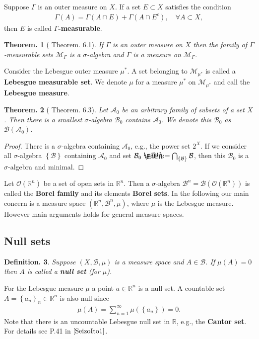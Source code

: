 \documentclass[openany, a4paper, oneside]{jsbook}
\makeatletter
\newcommand*{\defeq}{\mathrel{\rlap{%
\raisebox{0.3ex}{$\m@th\cdot$}}%
\raisebox{-0.3ex}{$\m@th\cdot$}}%
=}
\theoremstyle{break}
\theoremstyle{breakdefn}
\newtheorem{thm}{Theorem.}[section]
\newtheorem{defn}[thm]{Definition.}
\newcommand{\rbk}[1]{\left (#1\right)}
\newcommand{\cbk}[1]{\left\{#1\right\}}
\newcommand{\bbR}{\mathbb{R}}
\newcommand{\bbRn}{\mathbb{R}^n}
\newcommand{\calA}{\mathcal{A}}
\newcommand{\calB}{\mathcal{B}}
\newcommand{\calM}{\mathcal{M}}
\newcommand{\calO}{\mathcal{O}}
\newcommand{\upbf}[1]{\textup{\textbf{#1}}}
\makeatother
\begin{document}
Suppose $\Gamma$ is an outer measure on $X$.
If a set $E \subset X$ satisfies the condition
\begin{align}
 \Gamma (A)
 =
 \Gamma \rbk{A \cap E} + \Gamma \rbk{A \cap E^{c}},
 \quad \forall A \subset X,
\end{align}
then $E$ is called \upbf{$\Gamma$-measurable}.
\begin{thm}[\cite{SeizoIto1} Theorem. 6.1]
 If $\Gamma$ is an outer measure on $X$ then the family of $\Gamma$-measurable sets $\calM_{\Gamma}$ is
 a $\sigma$-algebra and $\Gamma$ is a measure on $\calM_{\Gamma}$.
\end{thm}
Consider the Lebesgue outer measure $\mu^*$.
A set belonging to $\calM_{\mu^*}$ is called a \textbf{Lebesgue measurable set}.
We denote $\mu$ for a measure $\mu^*$ on $\calM_{\mu^*}$ and call the \textbf{Lebesgue measure}.
\begin{thm}[\cite{SeizoIto1} Theorem. 6.3]
 Let $\calA_0$ be an arbitrary family of subsets of a set $X$.
 Then there is a smallest $\sigma$-algebra $\calB_0$ contains $\calA_0$.
 We denote this $\calB_0$ as $\calB (\calA_0)$.
\end{thm}
\begin{proof}
There is a $\sigma$-algebra containing $\calA_0$, e.g., the power set $2^X$.
If we consider all $\sigma$-algebra $\cbk{\calB}$ containing $\calA_0$ and
set $\calB_0 \defeq \bigcap_{\cbk{\calB}} \calB$,
then this $\calB_0$ is a $\sigma$-algebra and minimal.
\end{proof}

Let $\calO (\bbRn)$ be a set of open sets in $\bbRn$.
Then a $\sigma$-algebra $\calB^n = \calB (\calO (\bbRn))$ is called the \upbf{Borel family}
and its elements \upbf{Borel sets}.
In the following our main concern is a measure space $(\bbRn, \calB^n, \mu)$,
where $\mu$ is the Lebesgue measure.
However main arguments holds for general measure spaces.
\subsection{Null sets}


\begin{defn}
 Suppose $(X, \calB, \mu)$ is a measure space and $A \in \calB$.
 If $\mu (A) = 0$ then $A$ is called a \upbf{null set} (for $\mu$).
\end{defn}
For the Lebesgue measure $\mu$ a point $a \in \bbRn$ is a null set.
A countable set $A = \cbk{a_n}_n \in \bbRn$ is also null since
\begin{align}
 \mu (A)
 =
 \sum_{n=1}^{\infty} \mu \rbk{\cbk{a_n}}
 = 0.
\end{align}
Note that there is an uncountable Lebesgue null set in $\bbR$, e.g., the \textbf{Cantor set}.
For details see P.41 in $\cite{SeizoIto1}$.
\end{document}
